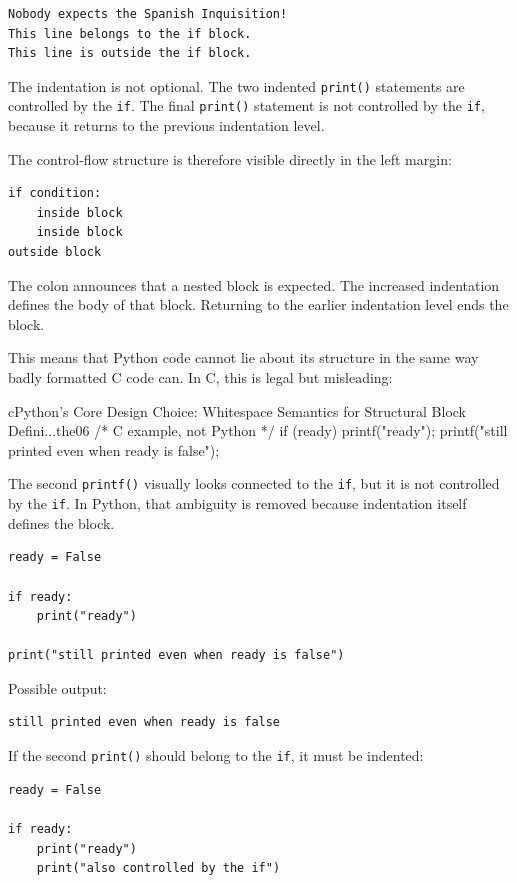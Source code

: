 \documentclass[a4paper,twoside]{report}
\begin{document}
\begin{verbatim}
Nobody expects the Spanish Inquisition!
This line belongs to the if block.
This line is outside the if block.
\end{verbatim}

The indentation is not optional. The two indented \texttt{print()} statements are controlled by the \texttt{if}. The final \texttt{print()} statement is not controlled by the \texttt{if}, because it returns to the previous indentation level.

The control-flow structure is therefore visible directly in the left margin:

\begin{verbatim}
if condition:
    inside block
    inside block
outside block
\end{verbatim}

The colon announces that a nested block is expected. The increased indentation defines the body of that block. Returning to the earlier indentation level ends the block.

This means that Python code cannot lie about its structure in the same way badly formatted C code can. In C, this is legal but misleading:

\begin{codebox}[]{c}{Python’s Core Design Choice: Whitespace Semantics for Structural Block Defini...}{the06}
/* C example, not Python */
if (ready)
    printf("ready\n");
    printf("still printed even when ready is false\n");
\end{codebox}


The second \texttt{printf()} visually looks connected to the \texttt{if}, but it is not controlled by the \texttt{if}. In Python, that ambiguity is removed because indentation itself defines the block.

\begin{verbatim}
ready = False

if ready:
    print("ready")

print("still printed even when ready is false")
\end{verbatim}

Possible output:

\begin{verbatim}
still printed even when ready is false
\end{verbatim}

If the second \texttt{print()} should belong to the \texttt{if}, it must be indented:

\begin{verbatim}
ready = False

if ready:
    print("ready")
    print("also controlled by the if")
\end{verbatim}
\end{document}
